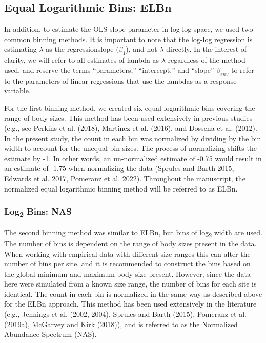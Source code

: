 \documentclass[
]{article}
\begin{document}
\hypertarget{equal-logarithmic-bins-elbn}{%
\subsection{Equal Logarithmic Bins:
ELBn}\label{equal-logarithmic-bins-elbn}}

In addition, to estimate the OLS slope parameter in log-log space, we
used two common binning methods. It is important to note that the
log-log regression is estimating \(\lambda\) as the regressionslope
(\(\beta_{1}\)), and not \(\lambda\) directly. In the interest of
clarity, we will refer to all estimates of lambda as \(\lambda\)
regardless of the method used, and reserve the terms ``parameters,''
``intercept,'' and ``slope'' \(\beta_{env}\) to refer to the parameters
of linear regressions that use the lambdas as a response variable.

For the first binning method, we created six equal logarithmic bins
covering the range of body sizes. This method has been used extensively
in previous studies (e.g., see Perkins et al. (2018), Martinez et al.
(2016), and Dossena et al. (2012). In the present study, the count in
each bin was normalized by dividing by the bin width to account for the
unequal bin sizes. The process of normalizing shifts the estimate by -1.
In other words, an un-normalized estimate of -0.75 would result in an
estimate of -1.75 when normalizing the data (Sprules and Barth 2015,
Edwards et al. 2017, Pomeranz et al. 2022). Throughout the manuscript,
the normalized equal logarithmic binning method will be referred to as
ELBn.

\hypertarget{log2-bins-nas}{%
\subsubsection{\texorpdfstring{Log\textsubscript{2} Bins:
NAS}{Log2 Bins: NAS}}\label{log2-bins-nas}}

The second binning method was similar to ELBn, but bins of
log\textsubscript{2} width are used. The number of bins is dependent on
the range of body sizes present in the data. When working with empirical
data with different size ranges this can alter the number of bins per
site, and it is recommended to construct the bins based on the global
minimum and maximum body size present. However, since the data here were
simulated from a known size range, the number of bins for each site is
identical. The count in each bin is normalized in the same way as
described above for the ELBn approach. This method has been used
extensively in the literature (e.g., Jennings et al. (2002, 2004),
Sprules and Barth (2015), Pomeranz et al. (2019a), McGarvey and Kirk
(2018)), and is referred to as the Normalized Abundance Spectrum (NAS).
\end{document}
